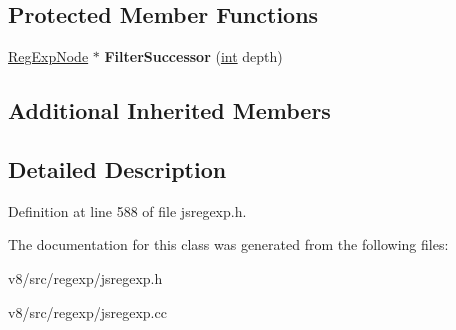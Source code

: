 \subsection*{Protected Member Functions}
\begin{DoxyCompactItemize}
\item 
\mbox{\label{classv8_1_1internal_1_1SeqRegExpNode_a62e5c1abd3cb8b927bd48be80299efd2}} 
\mbox{\hyperlink{classv8_1_1internal_1_1RegExpNode}{Reg\+Exp\+Node}} $\ast$ {\bfseries Filter\+Successor} (\mbox{\hyperlink{classint}{int}} depth)
\end{DoxyCompactItemize}
\subsection*{Additional Inherited Members}


\subsection{Detailed Description}


Definition at line 588 of file jsregexp.\+h.



The documentation for this class was generated from the following files\+:\begin{DoxyCompactItemize}
\item 
v8/src/regexp/jsregexp.\+h\item 
v8/src/regexp/jsregexp.\+cc\end{DoxyCompactItemize}
